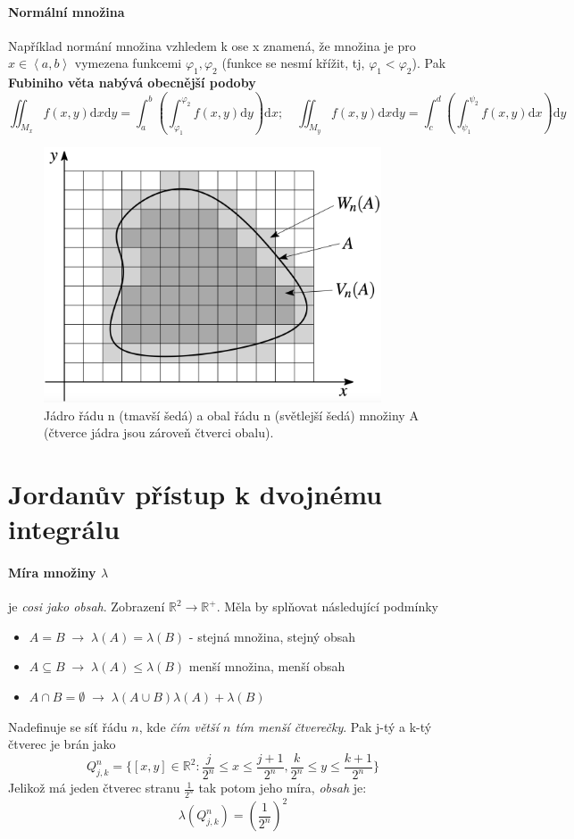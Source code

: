 \documentclass[a4paper, twoside,%
12pt]{article}
\newcommand{\dif}{\mathrm{d}}
\newcommand{\R}{\mathbb{R}}
\begin{document}
\paragraph{Normální množina} Například normání množina vzhledem k ose x znamená, že množina je pro $x\in\left< a,b\right>$ vymezena funkcemi $\varphi_1, \varphi_2$ (funkce se nesmí křížit, tj, $\varphi_1<\varphi_2$). Pak \textbf{Fubiniho věta nabývá obecnější podoby}
$$ \iint_{M_x} f(x,y)\dif x\dif y = \int_a^b \left( \int_{\varphi_1}^{\varphi_2} f(x,y) \dif y\right) \dif x;  \quad \iint_{M_y} f(x,y)\dif x\dif y = \int_c^d \left( \int_{\psi_1}^{\psi_2} f(x,y) \dif x\right) \dif y $$

\begin{figure}[h]
    \centering
    \includegraphics[width=10cm]{jordan_sit.png}
    \caption{Jádro řádu n (tmavší šedá) a obal řádu n (světlejší šedá) množiny A (čtverce jádra jsou zároveň čtverci obalu).}
    \label{fig:jordan}
\end{figure}

\section{Jordanův přístup k dvojnému integrálu}

\paragraph{Míra množiny $\lambda$} je \emph{cosi jako obsah}. Zobrazení $\R^2 \to \R^+$. Měla by splňovat následující podmínky
\begin{itemize}
    \item $A=B\; \rightarrow \; \lambda(A) = \lambda(B)$ - stejná množina, stejný obsah
    \item $A\subseteq B\; \rightarrow \; \lambda(A) \leq \lambda(B)$ menší množina, menší obsah
    \item $A\cap B = \emptyset\; \rightarrow \; \lambda(A\cup B ) \lambda(A) + \lambda(B)$
\end{itemize}

Nadefinuje se síť řádu $n$, kde \emph{čím větší $n$ tím menší čtverečky}. Pak j-tý a k-tý čtverec je brán jako
$$ Q_{j,k}^n = \lbrace [x,y]\in \R^2: \frac{j}{2^n} \leq x \leq \frac{j+1}{2^n}, \frac{k}{2^n} \leq y \leq \frac{k+1}{2^n}\rbrace $$
Jelikož má jeden čtverec stranu $\frac{1}{2^n}$ tak potom jeho míra, \emph{obsah} je:
$$\lambda(Q_{j,k}^n ) = \left(\frac{1}{2^n}\right)^2$$
\end{document}
